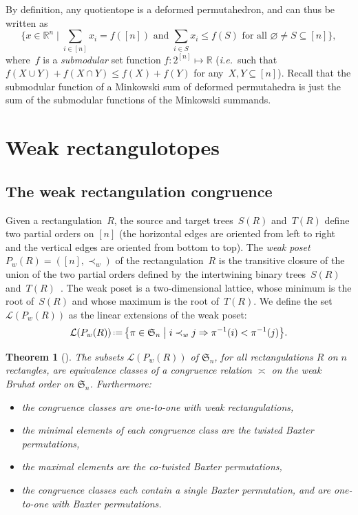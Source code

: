 \documentclass{amsart}
\newtheorem{theorem}{Theorem}%
\theoremstyle{definition}
\newcommand{\R}{\mathbb{R}} %
\newcommand{\f}[1]{\mathfrak{#1}} %
\newcommand{\bigset}[2]{\big\{ #1 \;\big|\; #2 \big\}} %
\newcommand{\Bigset}[2]{\Big\{ #1 \;\Big|\; #2 \Big\}} %
\newcommand{\eqdef}{\mbox{\,\raisebox{0.2ex}{\scriptsize\ensuremath{\mathrm:}}\ensuremath{=}\,}} %
\renewcommand{\implies}{\Rightarrow} %
\newcommand{\ie}{\textit{i.e.}~} %
\newcommand{\darkblue}{\color{darkblue}} %
\newcommand{\defn}[1]{\textsl{\darkblue #1}} %
\newcommand{
\weakeq}{\asymp}
\begin{document}
By definition, any quotientope is a deformed permutahedron, and can thus be written as
  \[
  \Bigset{x \in \R^n}{ \sum_{i \in [n]} x_i = f([n]) \text{ and } \sum_{i \in S} x_i \le f(S) \text{ for all } \varnothing \ne S \subseteq [n]},
  \]
where~$f$ is a \defn{submodular} set function $f:2^{[n]}\mapsto \R$ (\ie such that~$f(X \cup Y) + f(X \cap Y) \le f(X) + f(Y)$ for any~$X, Y \subseteq [n]$).
Recall that the submodular function of a Minkowski sum of deformed permutahedra is just the sum of the submodular functions of the Minkowski summands.


\section{Weak rectangulotopes}
\label{sec:wr}


\subsection{The weak rectangulation congruence}

Given a rectangulation~$R$, the source and target trees~$S(R)$ and~$T(R)$ define two partial orders on $[n]$ (the horizontal edges are oriented from left to right and the vertical edges are oriented from bottom to top).
The \defn{weak poset}~$P_w(R)=([n],\prec_w)$ of the rectangulation~$R$ is the transitive closure of the union of the two partial orders defined by the intertwining binary trees~$S(R)$ and~$T(R)$~\cite{MR4014603}.
The weak poset is a two-dimensional lattice, whose minimum is the root of~$S(R)$ and whose maximum is the root of~$T(R)$.
We define the set~$\mathcal{L}(P_w(R))$ as the linear extensions of the weak poset:
\[
\mathcal{L}(P_w(R)) \eqdef \bigset{\pi\in\f{S}_n }{ i\prec_w j\implies \pi^{-1}(i) < \pi^{-1}(j)}.
\]

\begin{theorem}[\cite{LawReading}]
  The subsets $\mathcal{L}(P_w(R))$ of $\f{S}_n$, for all rectangulations $R$ on $n$ rectangles, 
  are equivalence classes of a congruence relation $\weakeq$ on the weak Bruhat order on $\f{S}_n$.
  Furthermore:
  \begin{itemize}
  \item the congruence classes are one-to-one with weak rectangulations,  
  \item the minimal elements of each congruence class are the twisted Baxter permutations,
  \item the maximal elements are the co-twisted Baxter permutations,
  \item the congruence classes each contain a single Baxter permutation, and are one-to-one with Baxter permutations.
  \end{itemize}
\end{theorem}
\end{document}

